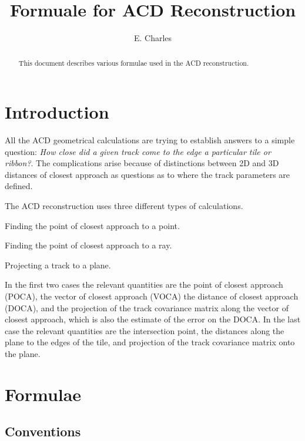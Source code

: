\documentclass[fleqn,twoside,draft]{article}
\title{Formuale for ACD Reconstruction}
\author{E. Charles}
\begin{document}
\maketitle


%
%
\begin{abstract}

This document describes various formulae used in the ACD reconstruction.
\vspace{1pc}
\end{abstract}

%
%
\section{Introduction \label{sec:introduction}}

All the ACD geometrical calculations are trying to establish answers to a simple question: {\em How close did a given track come to the edge a particular tile or ribbon?}.  The complications arise because of distinctions between 2D and 3D distances of closest approach as questions as to where the track parameters are defined.  

The ACD reconstruction uses three different types of calculations.
\begin{enumerate}
  {\item Finding the point of closest approach to a point.}
  {\item Finding the point of closest approach to a ray.}
  {\item Projecting a track to a plane.}
\end{enumerate}

In the first two cases the relevant quantities are the point of closest approach (POCA), the vector of closest approach (VOCA) the distance of closest approach (DOCA), and the projection of the track covariance matrix along the vector of closest approach, which is also the estimate of the error on the DOCA.  In the last case the relevant quantities are the intersection point, the distances along the plane to the edges of the tile, and projection of the track covariance matrix onto the plane.  
%
% 
\section{Formulae \label{sec:formulae}}

\subsection{Conventions}
\end{document}
